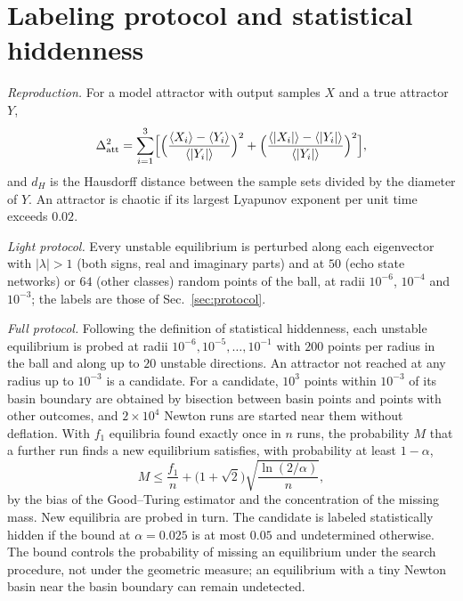 \documentclass[aip,cha,reprint,amsmath,amssymb,longbibliography]{revtex4-2}
\theoremstyle{definition}
\begin{document}
\section{Labeling protocol and statistical hiddenness}
\label{app:protocol}

\emph{Reproduction.} For a model attractor with output samples $X$ and a true attractor $Y$,
\begin{equation*}
\Delta_{\mathrm{att}}^2=\sum_{i=1}^3\Bigl[\Bigl(\frac{\langle X_i\rangle-\langle Y_i\rangle}{\langle|Y_i|\rangle}\Bigr)^2
+\Bigl(\frac{\langle|X_i|\rangle-\langle|Y_i|\rangle}{\langle|Y_i|\rangle}\Bigr)^2\Bigr],
\end{equation*}
and $d_H$ is the Hausdorff distance between the sample sets divided by the diameter of $Y$. An attractor is chaotic if its
largest Lyapunov exponent per unit time exceeds $0.02$.

\emph{Light protocol.} Every unstable equilibrium is perturbed along each eigenvector with $|\lambda|>1$ (both signs, real and
imaginary parts) and at $50$ (echo state networks) or $64$ (other classes) random points of the ball, at radii $10^{-6}$,
$10^{-4}$ and $10^{-3}$; the labels are those of Sec.~\ref{sec:protocol}.

\emph{Full protocol.} Following the definition of statistical
hiddenness,\cite{Good1953,McAllesterOrtiz2003,BerendKontorovich2013,BenHamou2017MissingMass} each unstable equilibrium is
probed at radii $10^{-6},10^{-5},\dots,10^{-1}$ with $200$ points per radius in the ball and along up to $20$ unstable
directions. An attractor not reached at any radius up to $10^{-3}$ is a candidate. For a candidate, $10^3$ points within
$10^{-3}$ of its basin boundary are obtained by bisection between basin points and points with other outcomes, and
$2\times10^4$ Newton runs are started near them without deflation. With $f_1$ equilibria found exactly once in $n$ runs, the
probability $M$ that a further run finds a new equilibrium satisfies, with probability at least $1-\alpha$,
\begin{equation*}
M\le\frac{f_1}{n}+\bigl(1+\sqrt2\bigr)\sqrt{\frac{\ln(2/\alpha)}{n}},
\end{equation*}
by the bias of the Good--Turing estimator and the concentration of the missing mass. New equilibria are probed in turn. The
candidate is labeled statistically hidden if the bound at $\alpha=0.025$ is at most $0.05$ and undetermined otherwise. The
bound controls the probability of missing an equilibrium under the search procedure, not under the geometric measure; an
equilibrium with a tiny Newton basin near the basin boundary can remain undetected.
\end{document}
